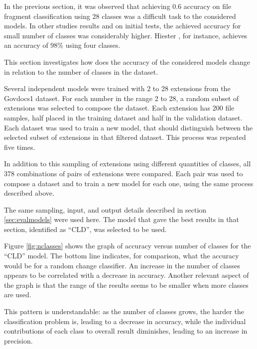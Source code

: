 \label{sec:numberofclasses}
In the previous section, it was observed that achieving 0.6 accuracy on file fragment classification using 28 classes was a difficult task to the considered models. In other studies results \cite{hiester_file_2018} \cite{sportiello_context-based_2012} \cite{amirani_feature-based_2013} \cite{maslim_distributed_2014} and on initial tests, the achieved accuracy for small number of classes was considerably higher. Hiester \cite{hiester_file_2018}, for instance, achieves an accuracy of 98\% using four classes.

This section investigates how does the accuracy of the considered models change in relation to the number of classes in the dataset.


Several independent models were trained with 2 to 28 extensions from the Govdocs1 dataset. For each number in the range 2 to 28, a random subset of extensions was selected to compose the dataset. Each extension has 200 file samples, half placed in the training dataset and half in the validation dataset. Each dataset was used to train a new model, that should distinguish between the selected subset of extensions in that filtered dataset. This process was repeated five times.



In addition to this sampling of extensions using different quantities of classes, all 378 combinations of pairs of extensions were compared. Each pair was used to compose a dataset and to train a new model for each one, using the same process described above.

The same sampling, input, and output details described in section \ref{sec:evalmodels} were used here. The model that gave the best results in that section, identified as ``CLD'', was selected to be used.

Figure \ref{fig:nclasses} shows the graph of accuracy versus number of classes for the ``CLD'' model. The bottom line indicates, for comparison, what the accuracy would be for a random change classifier. An increase in the number of classes appears to be  correlated with a decrease in accuracy. Another relevant aspect of the graph is that the range of the results seems to be smaller when more classes are used.  

This pattern is understandable: as the number of classes grows, the harder the classification problem is, leading to a decrease in accuracy, while the individual contributions of each class to overall result diminishes, leading to an increase in precision.

